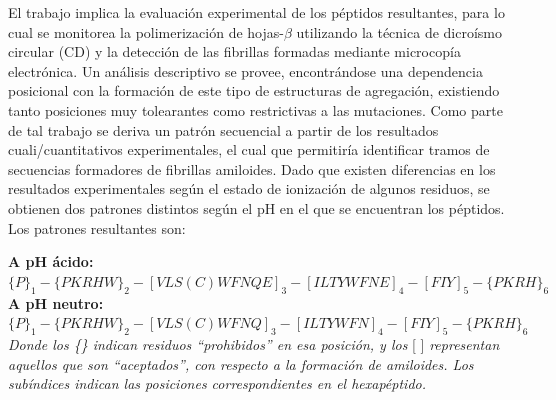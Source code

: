 El trabajo implica la evaluación experimental de los péptidos resultantes, para lo cual se monitorea la polimerización de hojas-$\beta$ utilizando la técnica de dicroísmo circular (CD) y la detección de las fibrillas formadas mediante 
microcopía electrónica. Un análisis descriptivo se provee\cite{de2004sequence}, encontrándose una dependencia posicional con la formación de este tipo de estructuras de agregación, existiendo tanto posiciones muy tolearantes como 
restrictivas a las mutaciones.
Como parte de tal trabajo se deriva un patrón secuencial a partir de los resultados cuali/cuantitativos experimentales, el cual que permitiría identificar tramos de secuencias formadores de fibrillas amiloides.
Dado que existen diferencias en los resultados experimentales según el estado de ionización de algunos residuos, se obtienen dos patrones distintos según el pH en el que se encuentran los péptidos.
Los patrones resultantes son:
\vspace{0.2cm}

\noindent \textbf{A pH ácido:} $\{P\}_1 -\{PKRHW\}_2 -[VLS(C)WFNQE]_3 -[ILTYWFNE]_4 -[FIY]_5- \{PKRH\}_6 $\\
\noindent \textbf{A pH neutro:}  $\{P\}_1 -\{PKRHW\}_2 -[VLS(C)WFNQ]_3 -[ILTYWFN]_4 -[FIY]_5- \{PKRH\}_6 $\\
\textit{\noindent Donde los \{\} indican residuos ``prohibidos'' en esa posición, y los} [ ] \textit{representan aquellos que son ``aceptados'', con respecto a la formación de amiloides.
Los subíndices indican las posiciones correspondientes en el hexapéptido.}

\vspace{0.2cm}
% 




